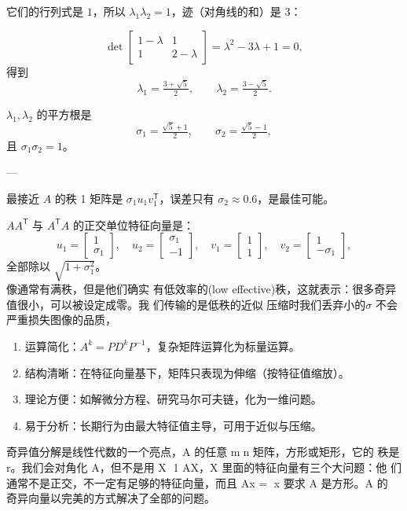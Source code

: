 它们的行列式是 $1$，所以 $\lambda_1 \lambda_2=1$，迹（对角线的和）是 $3$：

\[
\det\begin{bmatrix}1-\lambda & 1\\1 & 2-\lambda\end{bmatrix}
= \lambda^2-3\lambda+1=0,
\]
得到
\[
\lambda_1 = \tfrac{3+\sqrt{5}}{2}, \qquad
\lambda_2 = \tfrac{3-\sqrt{5}}{2}.
\]

$\lambda_1,\lambda_2$ 的平方根是
\[
\sigma_1=\tfrac{\sqrt{5}+1}{2}, \qquad
\sigma_2=\tfrac{\sqrt{5}-1}{2},
\]
且 $\sigma_1\sigma_2=1$。

---

最接近 $A$ 的秩 1 矩阵是 $\sigma_1 u_1 v_1^{\mathsf T}$，误差只有 $\sigma_2\approx 0.6$，是最佳可能。

$AA^{\mathsf T}$ 与 $A^{\mathsf T}A$ 的正交单位特征向量是：
\[
u_1=\begin{bmatrix}1\\ \sigma_1\end{bmatrix}, \quad
u_2=\begin{bmatrix}\sigma_1\\ -1\end{bmatrix}, \quad
v_1=\begin{bmatrix}1\\1\end{bmatrix}, \quad
v_2=\begin{bmatrix}1\\ -\sigma_1\end{bmatrix},
\]
全部除以 $\sqrt{1+\sigma_1^2}$。
\\像通常有满秩，但是他们确实
有低效率的(low effective)秩，这就表示：很多奇异值很小，可以被设定成零。我
们传输的是低秩的近似
压缩时我们丢弃小的$\sigma$ 不会严重损失图像的品质，

\begin{dxtips}[对角化的好处]
    
\begin{enumerate}
  \item 运算简化：$A^k = P D^k P^{-1}$，复杂矩阵运算化为标量运算。
  \item 结构清晰：在特征向量基下，矩阵只表现为伸缩（按特征值缩放）。
  \item 理论方便：如解微分方程、研究马尔可夫链，化为一维问题。
  \item 易于分析：长期行为由最大特征值主导，可用于近似与压缩。
\end{enumerate}
\end{dxtips}
奇异值分解是线性代数的一个亮点，A 的任意 mn 矩阵，方形或矩形，它的
秩是 r。我们会对角化 A，但不是用 X
1
AX，X 里面的特征向量有三个大问题：他
们通常不是正交，不一定有足够的特征向量，而且 Ax = x 要求 A 是方形。A 的
奇异向量以完美的方式解决了全部的问题。
